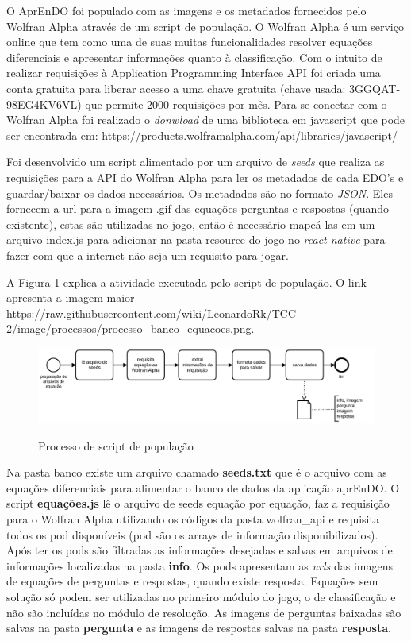 O AprEnDO foi populado com as imagens e os metadados fornecidos pelo Wolfran Alpha através de um script de população. O Wolfran Alpha é um serviço online que tem como uma de suas muitas funcionalidades resolver equações diferenciais e apresentar informações quanto à classificação. Com o intuito de realizar requisições à Application Programming Interface API foi criada uma conta gratuita para liberar acesso a uma chave gratuita (chave usada: 3GGQAT-98EG4KV6VL) que permite 2000 requisições por mês. Para se conectar com o Wolfran Alpha foi realizado o \textit{donwload} de uma biblioteca em javascript que pode ser encontrada em: \url{https://products.wolframalpha.com/api/libraries/javascript/} 

Foi desenvolvido um script alimentado por um arquivo de \textit{seeds} que realiza as requisições para a API do Wolfran Alpha para ler os metadados de cada EDO's e guardar/baixar os dados necessários. Os metadados são no formato \textit{JSON}. Eles fornecem a url para a imagem .gif das equações perguntas e respostas (quando existente), estas são utilizadas no jogo, então é necessário mapeá-las em um arquivo index.js para adicionar na pasta resource do jogo no \textit{react native} para fazer com que a internet não seja um requisito para jogar.
 
A Figura \ref{fig:processopopulacao} explica a atividade executada pelo script de população.
O link apresenta a imagem maior \url{https://raw.githubusercontent.com/wiki/LeonardoRk/TCC-2/image/processos/processo_banco_equacoes.png}.  

\begin{figure}[H]
\caption{Processo de script de população}
\includegraphics[width=\textwidth,height=\textheight, keepaspectratio]{figuras/processos/processo_banco_equacoes.png}
\label{fig:processopopulacao}
\end{figure}
Na pasta banco existe um arquivo chamado \textbf{seeds.txt} que é o arquivo com as equações diferenciais para alimentar o banco de dados da aplicação aprEnDO. O script \textbf{equações.js} lê o arquivo de seeds equação por equação, faz a requisição para o Wolfran Alpha utilizando os códigos da pasta wolfran\_api e requisita todos os pod disponíveis (pod são os arrays de informação disponibilizados). Após ter os pods são filtradas as informações desejadas e salvas em arquivos de informações localizadas na pasta \textbf{info}. Os pods apresentam as \textit{urls} das imagens de equações de perguntas e respostas, quando existe resposta. Equações sem solução só podem ser utilizadas no primeiro módulo do jogo, o de classificação e não são incluídas no módulo de resolução. As imagens de perguntas baixadas são salvas na pasta \textbf{pergunta} e as imagens de respostas salvas na pasta \textbf{resposta}.

